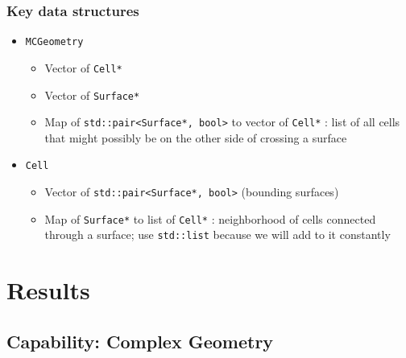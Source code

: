 \documentclass[color={usenames, dvipsnames},ignorenonframetext]{beamer}
\begin{document}
\begin{frame}
\frametitle{Key data structures}
\begin{itemize}
  \item \texttt{MCGeometry}
    \begin{itemize}
      \item Vector of \texttt{Cell*}
      \item Vector of \texttt{Surface*}
      \item Map of \texttt{std::pair<Surface*, bool>} to 
        vector of \texttt{Cell*} : list of all cells that might possibly be on
        the other side of crossing a surface
    \end{itemize}
  \item \texttt{Cell}
    \begin{itemize}
      \item Vector of \texttt{std::pair<Surface*, bool>} (bounding surfaces)
      \item Map of \texttt{Surface*} to list of \texttt{Cell*} : 
        neighborhood of cells connected through a surface; use
        \texttt{std::list} because we will add to it constantly
    \end{itemize}
\end{itemize}
\end{frame}

\section{Results}
\subsection{Capability: Complex Geometry}
\end{document}
